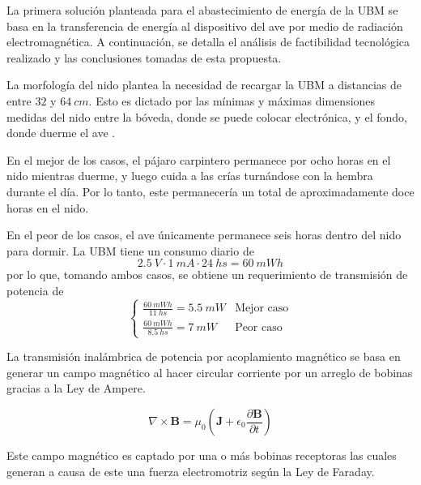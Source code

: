 La primera solución planteada para el abastecimiento de energía de la UBM se basa en la transferencia de energía al dispositivo del ave por medio de radiación electromagnética. A continuación, se detalla el análisis de factibilidad tecnológica realizado y las conclusiones tomadas de esta propuesta.


La morfología del nido plantea la necesidad de recargar la UBM a distancias de entre $32$ y $64 \ cm$. Esto es dictado por las mínimas y máximas dimensiones medidas del nido entre la bóveda, donde se puede colocar electrónica, y el fondo, donde duerme el ave \cite{ref:PaperValeriaOjeda}.

En el mejor de los casos, el pájaro carpintero permanece por ocho horas en el nido mientras duerme, y luego cuida a las crías turnándose con la hembra durante el día. Por lo tanto, este permanecería un total de aproximadamente doce horas en el nido.

En el peor de los casos, el ave únicamente permanece seis horas dentro del nido para dormir. La UBM tiene un consumo diario de
\begin{equation}
2.5 \ V \cdot 1 \ mA \cdot 24 \ hs = 60 \ mWh
\end{equation}
por lo que, tomando ambos casos, se obtiene un requerimiento de transmisión de potencia de
\begin{equation}
	\begin{cases} 
       \frac{60 \ mWh}{11 \ hs}= 5.5 \ mW & \text{Mejor caso} \\
       \frac{60 \ mWh}{8.5 \ hs} = 7 \ mW & \text{Peor caso}    
    \end{cases}
\end{equation}


La transmisión inalámbrica de potencia por acoplamiento magnético se basa en generar un campo magnético al hacer circular corriente por un arreglo de bobinas gracias a la Ley de Ampere.

\begin{equation}
\nabla \times \mathbf{B} = \mu_0\left( \mathbf{J} + \epsilon_0 \frac{\partial \mathbf{B}}{\partial t} \right)
\end{equation}

Este campo magnético es captado por una o más bobinas receptoras las cuales generan a causa de este una fuerza electromotriz según la Ley de Faraday. 

